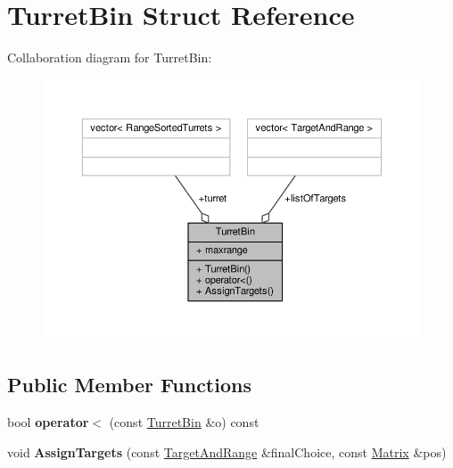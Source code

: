 \hypertarget{structTurretBin}{}\section{Turret\+Bin Struct Reference}
\label{structTurretBin}


Collaboration diagram for Turret\+Bin\+:
\nopagebreak
\begin{figure}[H]
\begin{center}
\leavevmode
\includegraphics[width=350pt]{d4/d7c/structTurretBin__coll__graph}
\end{center}
\end{figure}
\subsection*{Public Member Functions}
\begin{DoxyCompactItemize}
\item 
bool {\bfseries operator$<$} (const \hyperlink{structTurretBin}{Turret\+Bin} \&o) const \hypertarget{structTurretBin_a3cb1ba1e9cb3337cb8d1c8e872454362}{}\label{structTurretBin_a3cb1ba1e9cb3337cb8d1c8e872454362}

\item 
void {\bfseries Assign\+Targets} (const \hyperlink{structTargetAndRange}{Target\+And\+Range} \&final\+Choice, const \hyperlink{classMatrix}{Matrix} \&pos)\hypertarget{structTurretBin_aaf1c605e547bb1cff969d321393a2e62}{}\label{structTurretBin_aaf1c605e547bb1cff969d321393a2e62}

\end{DoxyCompactItemize}
